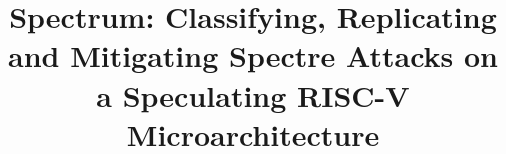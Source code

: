 \documentclass[conference]{IEEEtran}
\begin{document}

\title{Spectrum: Classifying, Replicating and Mitigating Spectre Attacks on a Speculating RISC-V Microarchitecture}


\author{
 \\
\and
{}
 \\
\and
{}
 \\
\and
{}
 \\
}

\maketitle











\end{document}
